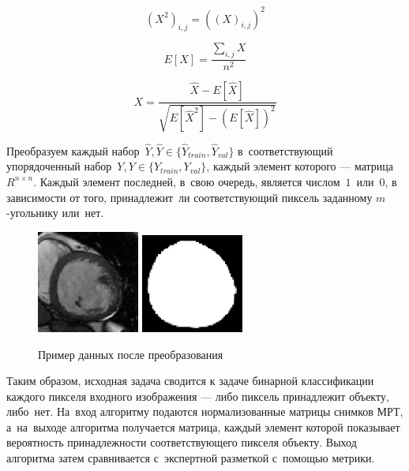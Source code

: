 \begin{equation}
\label{eq:input_squared}
(X^{2})_{i,j}=((X)_{i,j})^{2}
\end{equation}

\begin{equation}
\label{eq:input_expected_value}
E[X]=\frac{
  \sum_{i,j}X
}{
  n^{2}
}
\end{equation} 

\begin{equation}
\label{eq:input_normalized}
X = \frac{
  \hat{X} - E[\hat{X}]
}{\sqrt{
  E[\hat{X}^{2}] - (E[\hat{X}])^2
}}
\end{equation}

Преобразуем каждый набор~$\hat{Y},\hat{Y}\in{}\{\hat{Y}_{train},\hat{Y}_{val}\}$ 
в~соответствующий упорядоченный набор~$Y,Y\in{}\{Y_{train},Y_{val}\}$, 
каждый элемент которого — матрица~$R^{n\times{}n}$. Каждый элемент последней, 
в~свою очередь, является числом~$1$~или~$0$, в зависимости от того, принадлежит~ли 
соответствующий пиксель заданному \mbox{$m$-угольнику} или~нет.

\begin{figure}[hb]
  \begin{center}
    \includegraphics[width=0.3\textwidth,keepratio]{img/example-in}
    \includegraphics[width=0.3\textwidth,keepratio]{img/example-out}
  \end{center}
  \caption{Пример данных после преобразования}
\end{figure}

Таким образом, исходная задача сводится к задаче бинарной классификации каждого пикселя 
входного изображения — либо пиксель принадлежит объекту, либо~нет. На~вход алгоритму 
подаются нормализованные матрицы снимков МРТ, а~на~выходе алгоритма получается матрица, 
каждый элемент которой показывает вероятность принадлежности соответствующего пикселя объекту. 
Выход алгоритма затем сравнивается с~экспертной разметкой с~помощью метрики.

